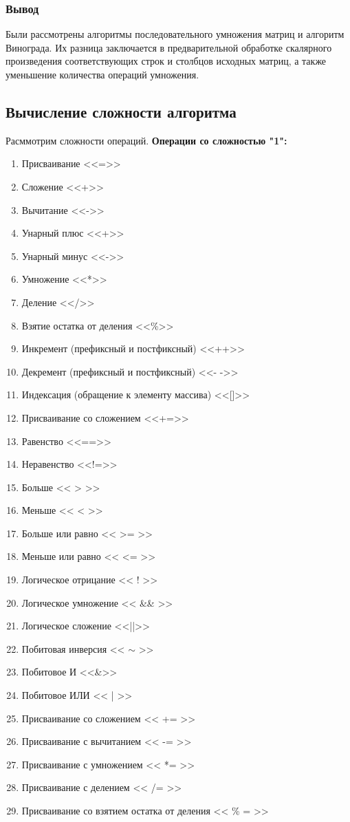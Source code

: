 \documentclass[a4paper]{article}
\begin{document}
 	\subsubsection{Вывод}
 	Были рассмотрены алгоритмы последовательного умножения матриц и алгоритм Винограда. Их разница заключается в предварительной обработке скалярного произведения соответствующих строк и столбцов исходных матриц, а также уменьшение количества операций умножения.
 	\subsection{Вычисление сложности алгоритма}
 	Расммотрим сложности операций.
 	\textbf{Операции со сложностью "1":}
 	\begin{enumerate}
 		\item Присваивание <<=>>
 		\item Сложение <<+>>
 		\item Вычитание <<->>
 		\item Унарный плюс <<+>>
 		\item Унарный минус <<->>
 		\item Умножение <<*>>
 		\item Деление <</>>
 		\item Взятие остатка от деления <<\%>>
 		\item Инкремент (префиксный и постфиксный) <<++>>
 		\item Декремент (префиксный и постфиксный) <<- ->>
 		\item Индексация (обращение к элементу массива) <<[]>>
 		\item Присваивание со сложением <<+=>>
 		\item Равенство <<==>>
 		\item Неравенство <<!=>>
 		\item Больше << > >>  
 		\item Меньше << < >>
 		\item Больше или равно << >= >>
 		\item Меньше или равно << <= >>
 		\item Логическое отрицание << ! >>
 		\item Логическое умножение << \&\& >>
 		\item Логическое сложение <<||>>
 		\item Побитовая инверсия << $\sim$ >>  
 		\item Побитовое И <<\&>>
 		\item Побитовое ИЛИ << | >>
 		\item Присваивание со сложением << += >>
 		\item Присваивание с вычитанием << -= >>
		\item Присваивание с умножением << *= >>
		\item Присваивание с делением << /= >>
		\item Присваивание  со взятием остатка от деления << \% = >>
 	\end{enumerate}
\end{document}
